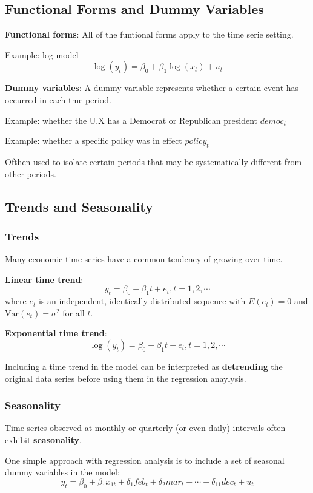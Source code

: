 \documentclass[11pt,a4paper]{article}
\begin{document}
\subsection{Functional Forms and Dummy Variables}
\textbf{Functional forms}:
All of the funtional forms apply to the time serie setting. \par
Example: log model
\[
\log(y_t) = \beta_0 + \beta_1 \log(x_t) + u_t
\]

\textbf{Dummy variables}:
A dummy variable represents whether a certain event has occurred in each tme period. \par
Example: whether the U.X has a Democrat or Republican president $democ_t$ \par
Example: whether a specific policy was in effect $policy_t$ \par

Ofthen used to isolate certain periods that may be systematically different from other periods. \par

\subsection{Trends and Seasonality}
\subsubsection{Trends}
Many economic time series have a common tendency of growing over time. \par

\textbf{Linear time trend}:
\[
y_t = \beta_0 + \beta_1 t + e_t, t = 1, 2, \cdots
\]
where $e_t$ is an independent, identically distributed sequence with $E(e_t) = 0$ and $\text{Var}(e_t) = \sigma^2$ for all $t$. \par

\textbf{Exponential time trend}:
\[
\log(y_t) = \beta_0 + \beta_1 t + e_t, t = 1, 2, \cdots
\]

Including a time trend in the model can be interpreted as \textbf{detrending} the original data series before using them in the regression anaylysis. \par
{}

\subsubsection{Seasonality}
Time series observed at monthly or quarterly (or even daily) intervals often exhibit \textbf{seasonality}. \par
One simple approach with regression analysis is to include a set of seasonal dummy variables in the model:
\[
y_t = \beta_0 + \beta_1 x_{1t} + \delta_1 feb_t + \delta_2 mar_t + \cdots + \delta_{11} dec_t + u_t
\]
\end{document}
